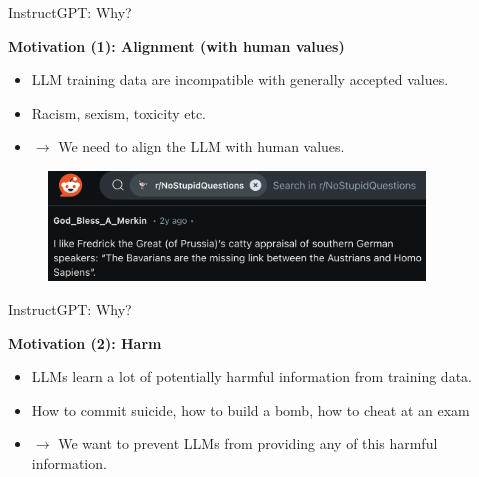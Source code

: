 \begin{vbframe}{InstructGPT: Why?}

\vfill

\textbf{Motivation (1): Alignment (with human values)}

	\begin{itemize}
		\item LLM training data are incompatible
		with generally accepted values.
		\item Racism, sexism, toxicity etc.
		\item $\rightarrow$ We need to align the LLM
		with human values.
	\end{itemize}

\vfill

\end{vbframe}

\begin{vbframe}
\begin{figure}
\centering
\includegraphics[width = 10cm]{figure/bavarianjoke.png}
\end{figure}





\vfill

\end{vbframe}




\begin{vbframe}{InstructGPT: Why?}

\vfill

\textbf{Motivation (2): Harm}

	\begin{itemize}
		\item LLMs learn a lot of potentially
		harmful information from training data.
		\item How to commit suicide, how to build a
		bomb, how to cheat at an exam
		\item $\rightarrow$ We want to prevent LLMs
		from providing any of this harmful information.
	\end{itemize}

\vfill

\end{vbframe}




